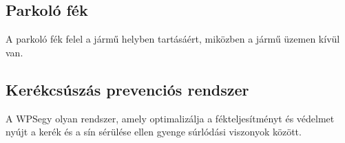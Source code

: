 \subsection{Parkoló fék}
A parkoló fék felel a jármű helyben tartásáért, miközben a jármű üzemen kívül van. 

\subsection{Kerékcsúszás prevenciós rendszer}
A WPS\footnotemark[\value{footnote}] egy olyan rendszer, amely optimalizálja a fékteljesítményt és védelmet nyújt a kerék és a sín sérülése ellen gyenge súrlódási viszonyok között.



